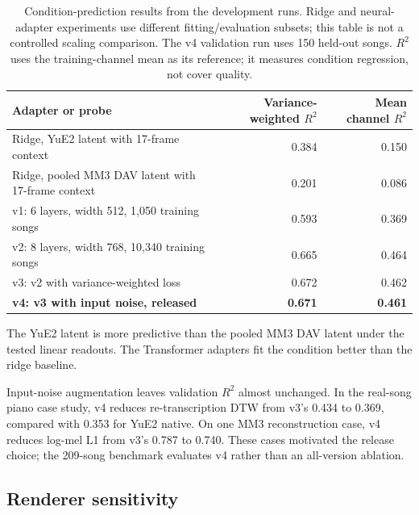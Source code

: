 \documentclass[11pt,a4paper]{article}
\begin{document}
\begin{table}[htbp]
    \centering
    \caption{Condition-prediction results from the development runs. Ridge and neural-adapter experiments use different fitting/evaluation subsets; this table is not a controlled scaling comparison. The v4 validation run uses 150 held-out songs. $R^2$ uses the training-channel mean as its reference; it measures condition regression, not cover quality.}
    \label{tab:learned}
    \small
    \begin{tabular}{lrr}
        \toprule
        Adapter or probe & Variance-weighted $R^2$ & Mean channel $R^2$ \\
        \midrule
        Ridge, YuE2 latent with 17-frame context & 0.384 & 0.150 \\
        Ridge, pooled MM3 DAV latent with 17-frame context & 0.201 & 0.086 \\
        v1: 6 layers, width 512, 1,050 training songs & 0.593 & 0.369 \\
        v2: 8 layers, width 768, 10,340 training songs & 0.665 & 0.464 \\
        v3: v2 with variance-weighted loss & 0.672 & 0.462 \\
        \textbf{v4: v3 with input noise, released} & \textbf{0.671} & \textbf{0.461} \\
        \bottomrule
    \end{tabular}
\end{table}

The YuE2 latent is more predictive than the pooled MM3 DAV latent under the tested linear readouts. The Transformer adapters fit the condition better than the ridge baseline.

Input-noise augmentation leaves validation $R^2$ almost unchanged. In the real-song piano case study, v4 reduces re-transcription DTW from v3's 0.434 to 0.369, compared with 0.353 for YuE2 native. On one MM3 reconstruction case, v4 reduces log-mel L1 from v3's 0.787 to 0.740. These cases motivated the release choice; the 209-song benchmark evaluates v4 rather than an all-version ablation.

\subsection{Renderer sensitivity}
\end{document}
